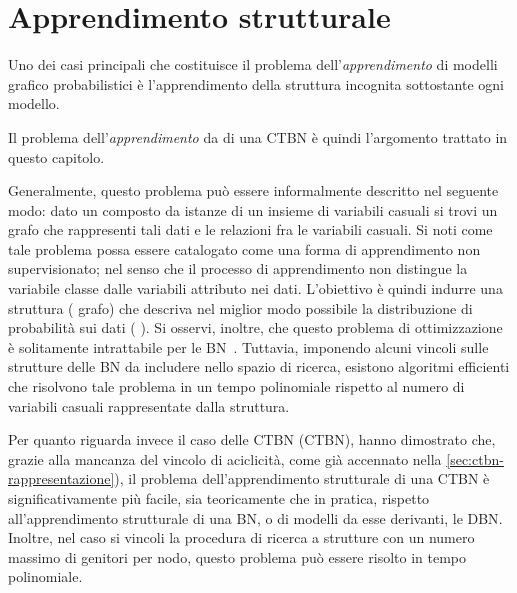 
\chapter{Apprendimento strutturale}\label{cap:structurallearning}
Uno dei casi principali che costituisce il problema dell'\emph{apprendimento} di modelli grafico probabilistici è l'apprendimento della struttura incognita sottostante ogni modello.

Il problema dell'\emph{apprendimento } da \emph{} di una \acs{CTBN} è quindi l'argomento trattato in questo capitolo.

Generalmente, questo problema può essere informalmente descritto nel seguente modo: dato un  composto da istanze di un insieme di variabili casuali si trovi un grafo che rappresenti tali dati e le relazioni fra le variabili casuali. Si noti come tale problema possa essere catalogato come una forma di apprendimento non supervisionato; nel senso che il processo di apprendimento non distingue la variabile classe dalle variabili attributo nei dati. L'obiettivo è quindi indurre una struttura (\ie{} grafo) che descriva nel miglior modo possibile la distribuzione di probabilità sui dati (\ie{} \emph{}). Si osservi, inoltre, che questo problema di ottimizzazione è solitamente intrattabile per le \acl{BN}~\citep{Chickering1994}. Tuttavia, imponendo alcuni vincoli sulle strutture delle \acs{BN} da includere nello spazio di ricerca, esistono algoritmi efficienti che risolvono tale problema in un tempo polinomiale rispetto al numero di variabili casuali rappresentate dalla struttura.

Per quanto riguarda invece il caso delle \acl{CTBN} (\acs{CTBN}), \citet{Nodelman2002} hanno dimostrato che, grazie alla mancanza del vincolo di aciclicità, come già accennato nella \autoref{sec:ctbn-rappresentazione}), il problema dell'apprendimento strutturale di una \acs{CTBN} è significativamente più facile, sia teoricamente che in pratica, rispetto all'apprendimento strutturale di una \acl{BN}, o di modelli da esse derivanti, \eg{} le \acf{DBN}. Inoltre, nel caso si vincoli la procedura di ricerca a strutture con un numero massimo di genitori per nodo, questo problema può essere risolto in tempo polinomiale.

